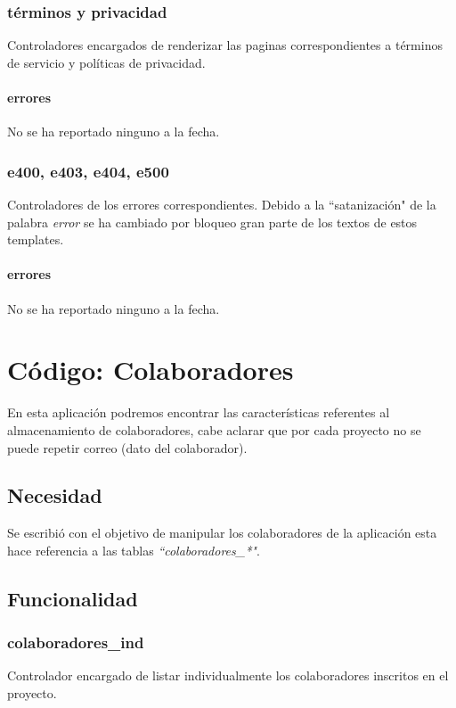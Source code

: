 \documentclass[10pt,a4paper]{book}
\begin{document}
	\subsection{términos y privacidad}
	Controladores encargados de renderizar las paginas correspondientes a términos de servicio y políticas de privacidad.
	\subsubsection{errores}
	No se ha reportado ninguno a la fecha.

	\subsection{e400, e403, e404, e500}
	Controladores de los errores correspondientes. Debido a la ``satanización" de la palabra \textit{error} se ha cambiado por bloqueo gran parte de los textos de estos templates.
	\subsubsection{errores}
	No se ha reportado ninguno a la fecha.


	\chapter{Código: Colaboradores}

	En esta aplicación podremos encontrar las características referentes al almacenamiento de colaboradores, cabe aclarar que por cada proyecto no se puede repetir correo (dato del colaborador).

	\section{Necesidad}

	Se escribió con el objetivo de manipular los colaboradores de la aplicación esta hace referencia a las tablas \textit{``colaboradores\_*"}.

	\section{Funcionalidad}

	\subsection{colaboradores\_ind}
	Controlador encargado de listar individualmente los colaboradores inscritos en el proyecto.
\end{document}
